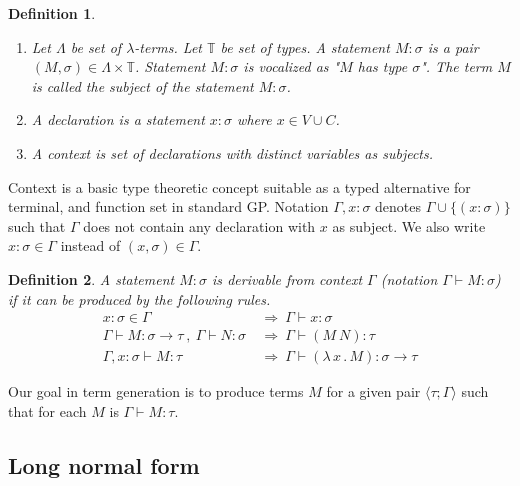 \documentclass[11pt]{article}
\newtheorem{definition}{Definition}
\newcommand{\lterms}{$\lambda$-terms\xspace}
\newcommand{\tur}[3]{#1\vdash{}#2 \colon #3}
\newcommand{\then}{\Rightarrow\xspace}
\newcommand{\lamb}[2]{( \lambda \, #1 \, . \, #2 )}
\newcommand{\lam}[2]{\lambda \, #1 \, . \, #2}
\newcommand{\ar}{\rightarrow\xspace}
\newcommand{\ul}[2]{\langle #1 ; #2 \rangle}
\begin{document}
\begin{article}
\begin{definition}~

\begin{enumerate}
 \item 	Let $\Lambda$ be set of {\it \lterms}. 
	Let $\mathbb{T}$ be set of {\it types}.       
	A {\it statement} $M : \sigma$ is a pair 
	$(M,\sigma) \in \Lambda \times \mathbb{T}$.
	Statement $M : \sigma$ is vocalized as 
	{\it "$M$ has type $\sigma$"}.
	The term $M$ is called the {\it subject} of the 
	statement $M : \sigma$.
 \item A \textit{declaration} is a statement 
 $x : \sigma$ where $x \in V \cup C$.
  
 \item A \textit{context} 
 is set of declarations with distinct variables as subjects.
\end{enumerate}
\end{definition}

Context is a basic type theoretic concept suitable as a typed alternative
for terminal, and function set in standard GP. 
Notation $\Gamma,x:\sigma $ denotes $ \Gamma\cup\{(x:\sigma)\}$ 
such that $\Gamma$ does not contain any declaration with $x$ as subject.
We also write $x:\sigma \in \Gamma$ instead of $(x,\sigma) \in \Gamma$.

\begin{definition}
A statement $M\colon\sigma$ is \textit{derivable from}
context $\Gamma$ (notation 
\mbox{$\Gamma\vdash{}M\colon\sigma$}) 
if it can be produced by the following rules.
\begin{align*}
x : \sigma \in \Gamma &~\then~ \tur{\Gamma}{x}{\sigma}\\
\tur{\Gamma}{M}{\sigma \ar \tau}~,~\tur{\Gamma}{N}{\sigma} 
&~\then~ \tur{\Gamma}{(M~N)}{\tau}\\  
\tur{\Gamma,x:\sigma}{M}{\tau}
&~\then~ \tur{\Gamma}{\lamb{x}{M}}{\sigma \ar \tau} 
\end{align*}
\end{definition}

Our goal in term generation is to produce terms $M$
for a given pair $\ul{\tau}{\Gamma}$
such that for each $M$ is $\tur{\Gamma}{M}{\tau}$.

\subsection{Long normal form}
\label{lnf}



\end{article}
\end{document}

